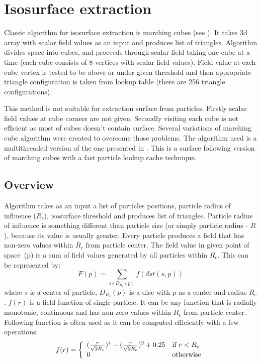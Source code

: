 \section{Isosurface extraction} \label{sec:isosurfaceextraction}
Classic algorithm for isosurface extraction is marching cubes (see \cite{LorensenCline1987}). It takes 3d array with scalar field values as an input and produces list of triangles. Algorithm divides space into cubes, and proceeds through scalar field taking one cube at a time (each cube consists of 8 vertices with scalar field values). Field value at each cube vertex is tested to be above or under given threshold and then appropriate triangle configuration is taken from lookup table (there are 256 triangle configurations).

This method is not suitable for extraction surface from particles. Firstly scalar field values at cube corners are not given. Secondly visiting each cube is not efficient as most of cubes doesn't contain surface. Several variations of marching cube algorithm were created to overcome those problems. The algorithm used is a multithreaded version of the one presented in \cite{RosenbergBirdwell2008}. This is a surface following version of marching cubes with a fast particle lookup cache technique. 

\subsection{Overview} \label{sec:iso_overview}
Algorithm takes as an input a list of particles positions, particle radius of influence ($R_c$), isosurface threshold and produces list of triangles. Particle radius of influence is something different than particle size (or simply particle radius - $R$), because its value is usually greater. Every particle produces a field that has non-zero values within $R_c$ from particle center. The field value in given point of space~(p) is a sum of field values generated by all particles within $R_c$. This can be represented by:
\begin{equation}
\label{eq:field_equation}
F(p) = \sum_{s~\epsilon~D_{R_c}(p)} f(dst(s, p))
\end{equation}
where $s$ is a center of particle, $D_{R_c}(p)$ is a disc with p as a center and radius $R_c$. $f(r)$ is a field function of single particle. It can be any function that is radially monotonic, continuous and has non-zero values within $R_c$ from particle center. Following function is often used as it can be computed efficiently with a few operations:
\begin{equation}
\label{eq:single_field_equation}
f(r) = \left\{ \begin{array}{ll}
({r \over \sqrt{2}R_c} )^4 - ( {r \over \sqrt{2}R_c} )^2 + 0.25 & \textrm{if $r < R_c$}\\
0 & \textrm{otherwise}\\
\end{array} \right.
\end{equation}

